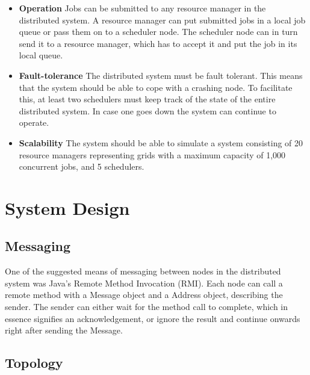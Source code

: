 \documentclass{article}
\begin{document}
\begin{itemize}
\item \textbf{Operation} Jobs can be submitted to any resource manager in the distributed system. A resource manager can put submitted jobs in a local job queue or pass them on to a scheduler node. The scheduler node can in turn send it to a resource manager, which has to accept it and put the job in its local queue.
\item \textbf{Fault-tolerance} The distributed system must be fault tolerant. This means that the system should be able to cope with a crashing node. To facilitate this, at least two schedulers must keep track of the state of the entire distributed system. In case one goes down the system can continue to operate.
\item \textbf{Scalability} The system should be able to simulate a system consisting of 20 resource managers representing grids with a maximum capacity of 1,000 concurrent jobs, and 5 schedulers.
\end{itemize}


\section{System Design}
\label{sec:design}

\subsection{Messaging}

One of the suggested means of messaging between nodes in the distributed system was Java's Remote Method Invocation (RMI). Each node can call a remote method with a Message object and a Address object, describing the sender. The sender can either wait for the method call to complete, which in essence signifies an acknowledgement, or ignore the result and continue onwards right after sending the Message. 

\subsection{Topology}
\end{document}
